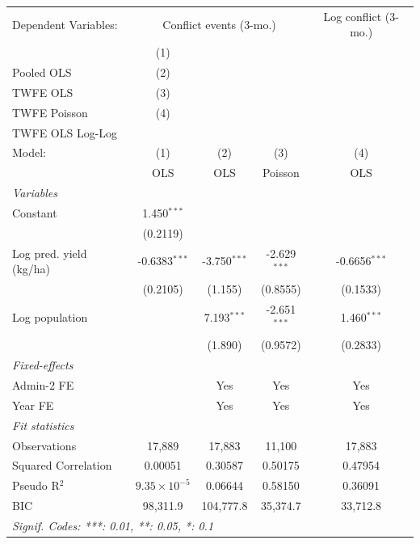 
\begingroup
\centering
\begin{tabular}{lcccc}
   \tabularnewline \midrule \midrule
   Dependent Variables: & \multicolumn{3}{c}{Conflict events (3-mo.)} & Log conflict (3-mo.)\\
                           & (1)\\Pooled OLS       & (2)\\TWFE OLS   & (3)\\TWFE Poisson   & (4)\\TWFE OLS Log-Log \\     
   Model:                  & (1)                   & (2)             & (3)                 & (4)\\  
                           &  OLS                  & OLS             & Poisson             & OLS\\  
   \midrule
   \emph{Variables}\\
   Constant                & 1.450$^{***}$         &                 &                     &   \\   
                           & (0.2119)              &                 &                     &   \\   
   Log pred. yield (kg/ha) & -0.6383$^{***}$       & -3.750$^{***}$  & -2.629$^{***}$      & -0.6656$^{***}$\\   
                           & (0.2105)              & (1.155)         & (0.8555)            & (0.1533)\\   
   Log population          &                       & 7.193$^{***}$   & -2.651$^{***}$      & 1.460$^{***}$\\   
                           &                       & (1.890)         & (0.9572)            & (0.2833)\\   
   \midrule
   \emph{Fixed-effects}\\
   Admin-2 FE              &                       & Yes             & Yes                 & Yes\\  
   Year FE                 &                       & Yes             & Yes                 & Yes\\  
   \midrule
   \emph{Fit statistics}\\
   Observations            & 17,889                & 17,883          & 11,100              & 17,883\\  
   Squared Correlation     & 0.00051               & 0.30587         & 0.50175             & 0.47954\\  
   Pseudo R$^2$            & $9.35\times 10^{-5}$  & 0.06644         & 0.58150             & 0.36091\\  
   BIC                     & 98,311.9              & 104,777.8       & 35,374.7            & 33,712.8\\  
   \midrule \midrule
   \multicolumn{5}{l}{\emph{Signif. Codes: ***: 0.01, **: 0.05, *: 0.1}}\\
\end{tabular}
 
